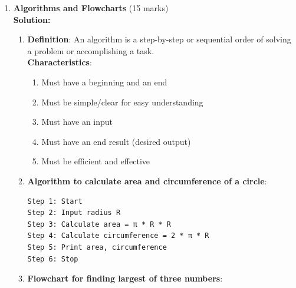 \documentclass[12pt]{article}
\begin{document}
\begin{enumerate}[left=0pt, label=\bfseries Q\arabic*., start=1]
    \item \textbf{Algorithms and Flowcharts} \hfill (15 marks)\\
    \textbf{Solution:}
    \begin{enumerate}[label=(\alph*)]
        \item \textbf{Definition}: An algorithm is a step-by-step or sequential order of solving a problem or accomplishing a task.\\
        \textbf{Characteristics}:
        \begin{enumerate}[label=\roman*.]
            \item Must have a beginning and an end
            \item Must be simple/clear for easy understanding
            \item Must have an input
            \item Must have an end result (desired output)
            \item Must be efficient and effective
        \end{enumerate}
        
        \item \textbf{Algorithm to calculate area and circumference of a circle}:
        \begin{verbatim}
Step 1: Start
Step 2: Input radius R
Step 3: Calculate area = π * R * R
Step 4: Calculate circumference = 2 * π * R
Step 5: Print area, circumference
Step 6: Stop
        \end{verbatim}
        
        \item \textbf{Flowchart for finding largest of three numbers}:
        \begin{center}
\end{center}
\end{enumerate}
\end{enumerate}
\end{document}
